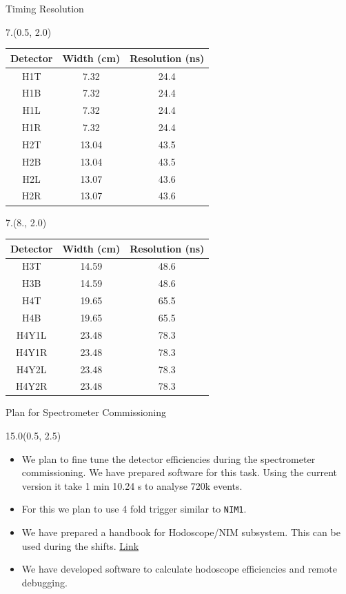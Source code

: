 \documentclass[12pt, xcolor={dvipsnames}, aspectratio = 169, sans,mathserif]{beamer}
\newenvironment{List}[2]
{
\begin{textblock}{#1}#2
\begin{itemize}
}
{
\end{itemize}
\end{textblock}
}
\begin{document}
\begin{frame}{Timing Resolution}
\begin{textblock}{7.}(0.5, 2.0)
\begin{center}
\begin{tabular}{c c c}
\hline
Detector & Width (cm) & Resolution (ns) \\
\hline
H1T & 7.32 & 24.4 \\
H1B & 7.32 & 24.4 \\
H1L & 7.32 & 24.4 \\
H1R & 7.32 & 24.4 \\
H2T & 13.04 & 43.5 \\
H2B & 13.04 & 43.5 \\
H2L & 13.07 & 43.6 \\
H2R & 13.07 & 43.6 \\
\hline
\end{tabular}
\end{center}
\end{textblock}

\begin{textblock}{7.}(8., 2.0)
\begin{center}
\begin{tabular}{c c c}
\hline
Detector & Width (cm) & Resolution (ns) \\
\hline
H3T & 14.59 & 48.6 \\
H3B & 14.59 & 48.6 \\
H4T & 19.65 & 65.5 \\
H4B & 19.65 & 65.5 \\
H4Y1L & 23.48 & 78.3 \\
H4Y1R & 23.48 & 78.3 \\
H4Y2L & 23.48 & 78.3 \\
H4Y2R & 23.48 & 78.3 \\
\hline
\end{tabular}
\end{center}
\end{textblock}

\end{frame}

\begin{frame}[fragile]{Plan for Spectrometer Commissioning}
\begin{List}{15.0}{(0.5, 2.5)}

  \item We plan to fine tune the detector efficiencies during the spectrometer commissioning. We have prepared software for this task.
  Using the current version it take 1 min 10.24 s to analyse 720k events.

  \item For this we plan to use 4 fold trigger similar to \verb|NIM1|.

  \item We have prepared a handbook for Hodoscope/NIM subsystem. This can be used during the shifts. \href{https://github.com/dinupa1/NIM_Hodo_Handbook/blob/main/NIM_Hodo_Handbook.pdf}{Link}

  \item We have developed software to calculate hodoscope efficiencies and remote debugging.

\end{List}
\end{frame}
\end{document}
